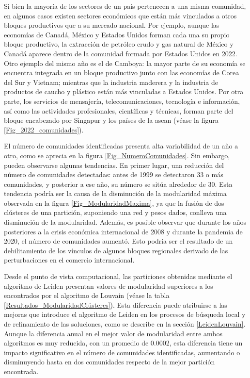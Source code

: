  Si bien la mayoría de los sectores de un país pertenecen a una misma comunidad, en algunos casos existen sectores económicos que están más vinculados a otros bloques productivos que a su mercado nacional. Por ejemplo, aunque las economías de Canadá, México y Estados Unidos forman cada una su propio bloque productivo, la extracción de petróleo crudo y gas natural de México y Canadá aparece dentro de la comunidad formada por Estados Unidos en 2022. Otro ejemplo del mismo año es el de Camboya: la mayor parte de su economía se encuentra integrada en un bloque productivo junto con las economías de Corea del Sur y Vietnam; mientras que la industria maderera y la industria de productos de caucho y plástico están más vinculadas a Estados Unidos. Por otra parte, los servicios de mensajería, telecomunicaciones, tecnología e información, así como las actividades profesionales, científicas y técnicas, forman parte del bloque encabezado por Singapur y los países de la \gls{asean} (véase la figura \ref{Fig_2022_comunidades}). 

El número de comunidades identificadas presenta alta variabilidad de un año a otro, como se aprecia en la figura \ref{Fig_NumeroComunidades}. Sin embargo, pueden observarse algunas tendencias. En primer lugar, una reducción del número de comunidades detectadas: antes de 1999 se detectaron 33 o más comunidades, y posterior a ese año, su número se sitúa alrededor de 30. Esta tendencia podría ser la causa de la disminución de la modularidad máxima observada en la figura \ref{Fig_ModularidadMaxima}, ya que la fusión de dos clústeres de una partición, suponiendo una red y pesos dados, conlleva una disminución de la modularidad. Además, es posible observar que durante los años posteriores a la crisis económica internacional de 2008 y durante la pandemia de 2020, el número de comunidades aumentó. Esto podría ser el resultado de un debilitamiento de los vínculos de algunos bloques regionales derivado de las perturbaciones en el comercio internacional. %

Desde el punto de vista computacional, las particiones obtenidas mediante el algoritmo de Leiden presentan valores de modularidad superiores a los encontrados por el algoritmo de Louvain (véase la tabla \ref{Resultados_ModularidadClústeres}). Esta diferencia puede atribuirse a las mejoras que introduce el algoritmo de Leiden en los procesos de búsqueda local y de refinamiento de las soluciones, como se describe en la sección \ref{LeidenLouvain}. Aunque la diferencia anual en el mejor valor de modularidad entre ambos algoritmos es muy reducida, con un promedio de 0.0002, esta diferencia tiene un impacto significativo en el número de comunidades identificadas, aumentando o disminuyendo hasta en dos comunidades respecto de la mejor partición encontrada.

